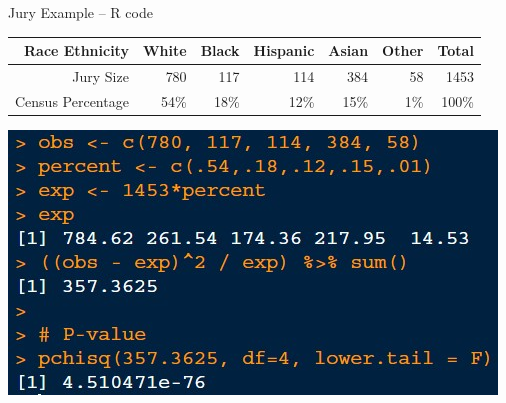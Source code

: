 \documentclass{beamer}
\begin{document}
\begin{frame}{Jury Example -- R code}
\begin{table}[ht]
\centering
\begin{tabular}{rrrrrrr}
  \hline
Race Ethnicity & White & Black & Hispanic & Asian & Other & Total \\ 
  \hline
Jury Size & 780 & 117 & 114 & 384 & 58 & 1453 \\
Census Percentage & 54\% & 18\% & 12\% & 15\% & 1\% & 100\% \\
   \hline
\end{tabular}
\end{table}

\begin{center}
    \includegraphics[scale=1]{img/juryexample_rcode.jpg}
\end{center}
\end{frame}


%
%
\end{document}
